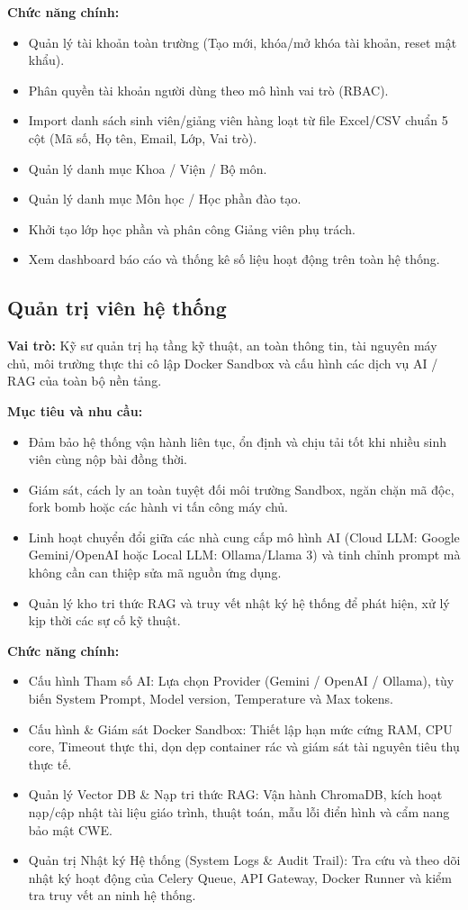 \documentclass[12pt,a4paper,oneside]{report}
\begin{document}
\noindent\textbf{Chức năng chính:}
\begin{itemize}
  \item Quản lý tài khoản toàn trường (Tạo mới, khóa/mở khóa tài khoản, reset mật khẩu).
  \item Phân quyền tài khoản người dùng theo mô hình vai trò (RBAC).
  \item Import danh sách sinh viên/giảng viên hàng loạt từ file Excel/CSV chuẩn 5 cột (Mã số, Họ tên, Email, Lớp, Vai trò).
  \item Quản lý danh mục Khoa / Viện / Bộ môn.
  \item Quản lý danh mục Môn học / Học phần đào tạo.
  \item Khởi tạo lớp học phần và phân công Giảng viên phụ trách.
  \item Xem dashboard báo cáo và thống kê số liệu hoạt động trên toàn hệ thống.
\end{itemize}

\subsection{Quản trị viên hệ thống}
\textbf{Vai trò:} Kỹ sư quản trị hạ tầng kỹ thuật, an toàn thông tin, tài nguyên máy chủ, môi trường thực thi cô lập Docker Sandbox và cấu hình các dịch vụ AI / RAG của toàn bộ nền tảng.

\noindent\textbf{Mục tiêu và nhu cầu:}
\begin{itemize}
  \item Đảm bảo hệ thống vận hành liên tục, ổn định và chịu tải tốt khi nhiều sinh viên cùng nộp bài đồng thời.
  \item Giám sát, cách ly an toàn tuyệt đối môi trường Sandbox, ngăn chặn mã độc, fork bomb hoặc các hành vi tấn công máy chủ.
  \item Linh hoạt chuyển đổi giữa các nhà cung cấp mô hình AI (Cloud LLM: Google Gemini/OpenAI hoặc Local LLM: Ollama/Llama 3) và tinh chỉnh prompt mà không cần can thiệp sửa mã nguồn ứng dụng.
  \item Quản lý kho tri thức RAG và truy vết nhật ký hệ thống để phát hiện, xử lý kịp thời các sự cố kỹ thuật.
\end{itemize}

\noindent\textbf{Chức năng chính:}
\begin{itemize}
  \item Cấu hình Tham số AI: Lựa chọn Provider (Gemini / OpenAI / Ollama), tùy biến System Prompt, Model version, Temperature và Max tokens.
  \item Cấu hình \& Giám sát Docker Sandbox: Thiết lập hạn mức cứng RAM, CPU core, Timeout thực thi, dọn dẹp container rác và giám sát tài nguyên tiêu thụ thực tế.
  \item Quản lý Vector DB \& Nạp tri thức RAG: Vận hành ChromaDB, kích hoạt nạp/cập nhật tài liệu giáo trình, thuật toán, mẫu lỗi điển hình và cẩm nang bảo mật CWE.
  \item Quản trị Nhật ký Hệ thống (System Logs \& Audit Trail): Tra cứu và theo dõi nhật ký hoạt động của Celery Queue, API Gateway, Docker Runner và kiểm tra truy vết an ninh hệ thống.
\end{itemize}
\end{document}
